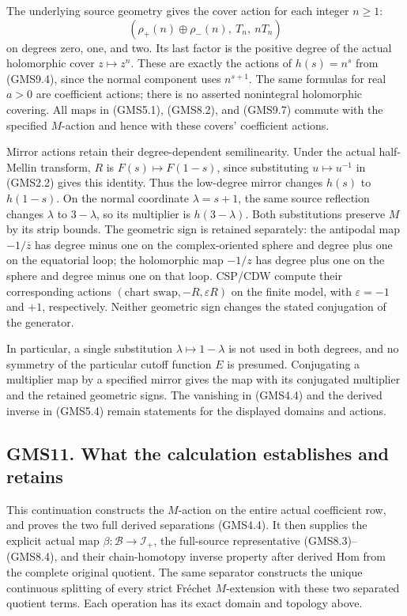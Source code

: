 The underlying source geometry gives the cover action for each integer
\(n\ge1\): \[
(\rho_+(n)\oplus\rho_-(n),\ T_n,\ nT_n)
\tag{GMS10.3}
\] on degrees zero, one, and two. Its last factor is the positive degree
of the actual holomorphic cover \(z\mapsto z^n\). These are exactly the
actions of \(h(s)=n^s\) from (GMS9.4), since the normal component uses
\(n^{s+1}\). The same formulas for real \(a>0\) are coefficient actions;
there is no asserted nonintegral holomorphic covering. All maps in
(GMS5.1), (GMS8.2), and (GMS9.7) commute with the specified \(M\)-action
and hence with these covers' coefficient actions.

Mirror actions retain their degree-dependent semilinearity. Under the
actual half-Mellin transform, \(R\) is \(F(s)\mapsto F(1-s)\), since
substituting \(u\mapsto u^{-1}\) in (GMS2.2) gives this identity. Thus
the low-degree mirror changes \(h(s)\) to \(h(1-s)\). On the normal
coordinate \(\lambda=s+1\), the same source reflection changes
\(\lambda\) to \(3-\lambda\), so its multiplier is \(h(3-\lambda)\).
Both substitutions preserve \(M\) by its strip bounds. The geometric
sign is retained separately: the antipodal map \(-1/\overline z\) has
degree minus one on the complex-oriented sphere and degree plus one on
the equatorial loop; the holomorphic map \(-1/z\) has degree plus one on
the sphere and degree minus one on that loop. CSP/CDW compute their
corresponding actions \((\text{chart swap},-R,\varepsilon R)\) on the
finite model, with \(\varepsilon=-1\) and \(+1\), respectively. Neither
geometric sign changes the stated conjugation of the generator.

In particular, a single substitution \(\lambda\mapsto1-\lambda\) is not
used in both degrees, and no symmetry of the particular cutoff function
\(E\) is presumed. Conjugating a multiplier map by a specified mirror
gives the map with its conjugated multiplier and the retained geometric
signs. The vanishing in (GMS4.4) and the derived inverse in (GMS5.4)
remain statements for the displayed domains and actions.

\subsection{GMS11. What the calculation establishes and
retains}\label{gms11.-what-the-calculation-establishes-and-retains}

This continuation constructs the \(M\)-action on the entire actual
coefficient row, and proves the two full derived separations (GMS4.4).
It then supplies the explicit actual map
\(\beta:\mathcal B\to\mathcal I_+\), the full-source representative
(GMS8.3)--(GMS8.4), and their chain-homotopy inverse property after
derived Hom from the complete original quotient. The same separator
constructs the unique continuous splitting of every strict Fréchet
\(M\)-extension with these two separated quotient terms. Each operation
has its exact domain and topology above.

